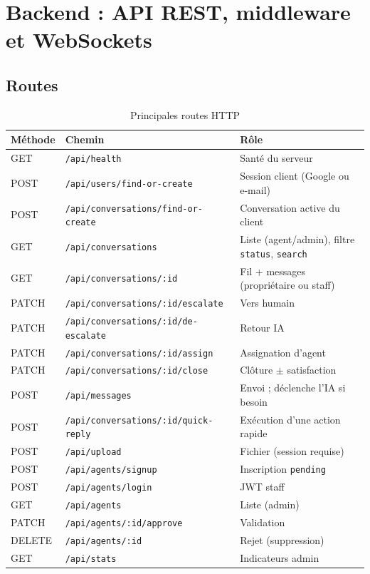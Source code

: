 \section{Backend : API REST, middleware et WebSockets}

\subsection{Routes}

\begin{table}[H]
\centering
\caption{Principales routes HTTP}
\label{tab:api}
\small
\begin{tabularx}{\textwidth}{|l|l|X|}
\hline
Méthode & Chemin & Rôle \\
\hline
GET & \texttt{/api/health} & Santé du serveur \\
\hline
POST & \texttt{/api/users/find-or-create} & Session client (Google ou e-mail) \\
\hline
POST & \texttt{/api/conversations/find-or-create} & Conversation active du client \\
\hline
GET & \texttt{/api/conversations} & Liste (agent/admin), filtre \texttt{status}, \texttt{search} \\
\hline
GET & \texttt{/api/conversations/:id} & Fil + messages (propriétaire ou staff) \\
\hline
PATCH & \texttt{/api/conversations/:id/escalate} & Vers humain \\
\hline
PATCH & \texttt{/api/conversations/:id/de-escalate} & Retour IA \\
\hline
PATCH & \texttt{/api/conversations/:id/assign} & Assignation d'agent \\
\hline
PATCH & \texttt{/api/conversations/:id/close} & Clôture $\pm$ satisfaction \\
\hline
POST & \texttt{/api/messages} & Envoi ; déclenche l'IA si besoin \\
\hline
POST & \texttt{/api/conversations/:id/quick-reply} & Exécution d'une action rapide \\
\hline
POST & \texttt{/api/upload} & Fichier (session requise) \\
\hline
POST & \texttt{/api/agents/signup} & Inscription \texttt{pending} \\
\hline
POST & \texttt{/api/agents/login} & JWT staff \\
\hline
GET & \texttt{/api/agents} & Liste (admin) \\
\hline
PATCH & \texttt{/api/agents/:id/approve} & Validation \\
\hline
DELETE & \texttt{/api/agents/:id} & Rejet (suppression) \\
\hline
GET & \texttt{/api/stats} & Indicateurs admin \\
\hline
\end{tabularx}
\end{table}

